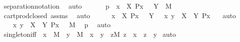 \begin{isabellebody}
\ separation{\isacharunderscore}{\kern0pt}notation\ \isamarkupfalse%
\ auto\ \isanewline
\ \ \isamarkupfalse%
\ \isamarkupfalse%
\ p{}{\isacharcolon}{\kern0pt}\ {\isachardoublequoteopen}{\isacharbraceleft}{\kern0pt}\ x\ {\isasymin}\ X{\isachardot}{\kern0pt}\ P{\isacharparenleft}{\kern0pt}x{\isacharparenright}{\kern0pt}\ {\isacharbraceright}{\kern0pt}\ {\isasymtimes}\ Y\ {\isasymin}\ M{\isachardoublequoteclose}\ \isamarkupfalse%
\ cartprod{\isacharunderscore}{\kern0pt}closed\ assms\ \isamarkupfalse%
\ auto\ \isanewline
\ \ \isamarkupfalse%
\ {\isachardoublequoteopen}{\isacharbraceleft}{\kern0pt}\ x\ {\isasymin}\ X{\isachardot}{\kern0pt}\ P{\isacharparenleft}{\kern0pt}x{\isacharparenright}{\kern0pt}\ {\isacharbraceright}{\kern0pt}\ {\isasymtimes}\ Y\ {\isacharequal}{\kern0pt}\ {\isacharbraceleft}{\kern0pt}\ {\isacharless}{\kern0pt}x{\isacharcomma}{\kern0pt}\ y{\isachargreater}{\kern0pt}\ {\isasymin}\ X\ {\isasymtimes}\ Y{\isachardot}{\kern0pt}\ P{\isacharparenleft}{\kern0pt}x{\isacharparenright}{\kern0pt}\ {\isacharbraceright}{\kern0pt}{\isachardoublequoteclose}\ \isamarkupfalse%
\ auto\isanewline
\ \ \isamarkupfalse%
\ \isamarkupfalse%
\ {\isachardoublequoteopen}{\isacharbraceleft}{\kern0pt}\ {\isacharless}{\kern0pt}x{\isacharcomma}{\kern0pt}\ y{\isachargreater}{\kern0pt}\ {\isasymin}\ X\ {\isasymtimes}\ Y{\isachardot}{\kern0pt}\ P{\isacharparenleft}{\kern0pt}x{\isacharparenright}{\kern0pt}\ {\isacharbraceright}{\kern0pt}\ {\isasymin}\ M{\isachardoublequoteclose}\ \isamarkupfalse%
\ p{}\ \isamarkupfalse%
\ auto\ \isanewline
{}\isamarkupfalse%
%
\endisatagproof
{\isafoldproof}%
%
\isadelimproof
\ \isanewline
%
\endisadelimproof
\isanewline
{}\isamarkupfalse%
\ singleton{\isacharunderscore}{\kern0pt}iff{}\ {\isacharcolon}{\kern0pt}\ {\isachardoublequoteopen}x\ {\isasymin}\ M\ {\isasymLongrightarrow}\ y\ {\isasymin}\ M\ {\isasymLongrightarrow}\ x\ {\isacharequal}{\kern0pt}\ {\isacharbraceleft}{\kern0pt}y{\isacharbraceright}{\kern0pt}\ {\isasymlongleftrightarrow}\ {\isacharparenleft}{\kern0pt}{\isasymforall}z{\isasymin}M{\isachardot}{\kern0pt}\ z\ {\isasymin}\ x\ {\isasymlongleftrightarrow}\ z\ {\isacharequal}{\kern0pt}\ y{\isacharparenright}{\kern0pt}{\isachardoublequoteclose}\isanewline
%
\isadelimproof
%
\endisadelimproof
%
\isatagproof
{}\isamarkupfalse%
\ {\isacharparenleft}{\kern0pt}auto{\isacharparenright}{\kern0pt}\ \ \isanewline

\end{isabellebody}
